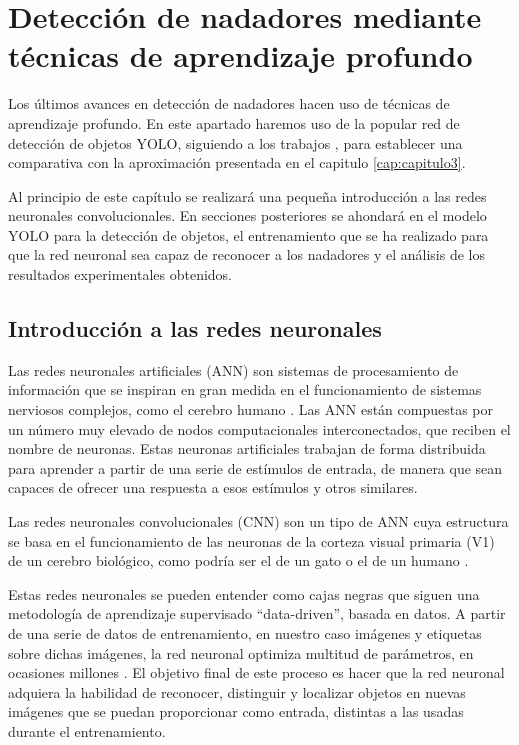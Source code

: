 \chapter{Detección de nadadores mediante técnicas de aprendizaje profundo} \label{cap:capitulo4}

Los últimos avances en detección de nadadores hacen uso de técnicas de aprendizaje profundo. En este apartado haremos uso de la popular red de detección de objetos YOLO, siguiendo a los trabajos \cite{comparisoncnnscoches} \cite{comparativaseniales} \cite{rcnnvsyolodivers}, para establecer una comparativa con la aproximación presentada en el capitulo \ref{cap:capitulo3}.

Al principio de este capítulo se realizará una pequeña introducción a las redes neuronales convolucionales. En secciones posteriores se ahondará en el modelo YOLO para la detección de objetos, el entrenamiento que se ha realizado para que la red neuronal sea capaz de reconocer a los nadadores y el análisis de los resultados experimentales obtenidos.


\section{Introducción a las redes neuronales}


Las redes neuronales artificiales (ANN) son sistemas de procesamiento de información que se inspiran en gran medida en el funcionamiento de sistemas nerviosos complejos, como el cerebro humano \cite{rnatheoryi}. Las ANN están compuestas por un número muy elevado de nodos computacionales interconectados, que reciben el nombre de neuronas. Estas neuronas artificiales trabajan de forma distribuida para aprender a partir de una serie de estímulos de entrada, de manera que sean capaces de ofrecer una respuesta a esos estímulos y otros similares. 

Las redes neuronales convolucionales (CNN) son un tipo de ANN cuya estructura se basa en el funcionamiento de las neuronas de la corteza visual primaria (V1) de un cerebro biológico, como podría ser el de un gato o el de un humano \cite{reviewcnn}. 

Estas redes neuronales se pueden entender como cajas negras que siguen una metodología de aprendizaje supervisado ``data-driven'', basada en datos. A partir de una serie de datos de entrenamiento, en nuestro caso imágenes y etiquetas sobre dichas imágenes, la red neuronal optimiza multitud de parámetros, en ocasiones millones \cite{rnatheoryi}. El objetivo final de este proceso es hacer que la red neuronal adquiera la habilidad de reconocer, distinguir y localizar objetos en nuevas imágenes que se puedan proporcionar como entrada, distintas a las usadas durante el entrenamiento.

